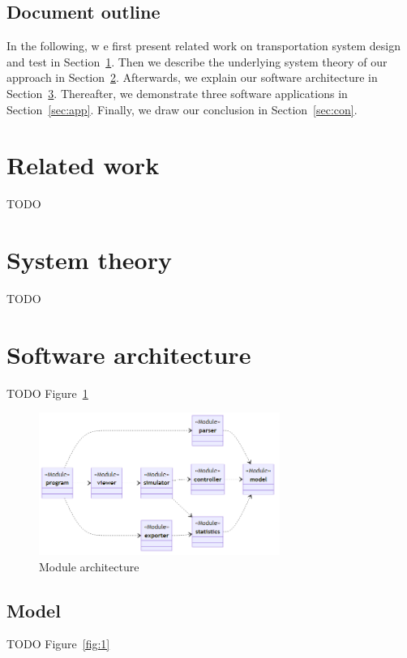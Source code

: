 \documentclass{article}
\begin{document}
    \subsection*{Document outline}
    In the following, w e first present related work on transportation system design and test in Section~\ref{sec:related}.
    Then we describe the underlying system theory of our approach in Section~\ref{sec:theory}.
    Afterwards, we explain our software architecture in Section~\ref{sec:arch}.
    Thereafter, we demonstrate three software applications in Section~\ref{sec:app}.
    Finally, we draw our conclusion in Section~\ref{sec:con}.

    \section{Related work}
    \label{sec:related}
    TODO

    \section{System theory}
    \label{sec:theory}
    TODO

    \section{Software architecture}
    \label{sec:arch}
    TODO Figure~\ref{fig:0}

    \begin{figure}
        \centering
        \includegraphics[width=0.7\textwidth]{../../diagrams/architecture.png}
        \caption{Module architecture}
        \label{fig:0}
    \end{figure}

    \subsection{Model}
    TODO Figure~\ref{fig:1}
\end{document}
